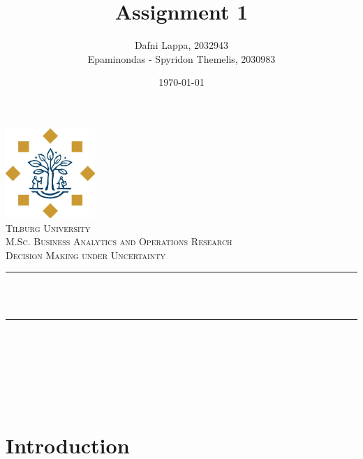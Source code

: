 \documentclass[12pt]{article}
\title{Assignment 1}
\author{ Dafni Lappa, 2032943 \\
	Epaminondas - Spyridon Themelis, 2030983}          %
\date{\today}                                          %
\makeatletter
\let\thetitle\@title
\let\theauthor\@author
\let\thedate\@date
\makeatother
\begin{document}
	
	
	\begin{titlepage}
		\centering
		\vspace*{0.5 cm}
		\includegraphics[scale = 0.75]{logo.png}\\[1.0 cm]   %
		\textsc{\LARGE Tilburg University}\\[2.0 cm]   %
		\textsc{\Large M.Sc. Business Analytics and Operations Research}\\[0.5 cm]               %
		\textsc{\large Decision Making under Uncertainty}\\[0.5 cm]               %
		\rule{\linewidth}{0.2 mm} \\[0.4 cm]
		{ \huge \bfseries \thetitle}\\
		\rule{\linewidth}{0.2 mm} \\[1.5 cm]
		
		\begin{minipage}{0.4\textwidth}
			\begin{center} \large
				\theauthor
			\end{center}
		\end{minipage}~
		\begin{minipage}{0.4\textwidth}
		\end{minipage}\\[2 cm]
		
		{\large \thedate}\\[2 cm]
		
		\vfill
		
	\end{titlepage}
	
	
	\tableofcontents
	\newpage
	\listoffigures
	\newpage
	\listoftables
	\newpage
	
	
	\section{Introduction}
	
\end{document}
